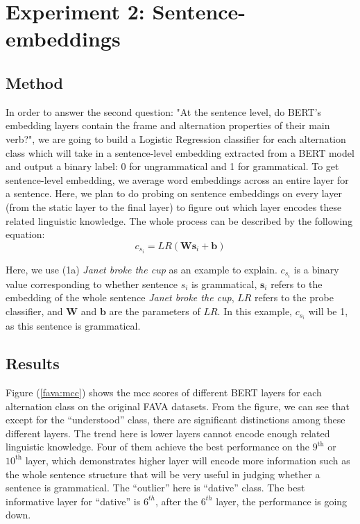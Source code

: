 \documentclass[11pt]{article}
\begin{document}
\section{Experiment 2: Sentence-embeddings}
\label{sec:experiment2}

\subsection{Method}
In order to answer the second question: "At the sentence level, do BERT's embedding layers contain the frame and alternation properties of their main verb?", we are going to build a Logistic Regression classifier for each alternation class which will take in a sentence-level embedding extracted from a BERT model and output a binary label: 0 for ungrammatical and 1 for grammatical. To get sentence-level embedding, we average word embeddings across an entire layer for a sentence. Here, we plan to do probing on sentence embeddings on every layer (from the static layer to the final layer) to figure out which layer encodes these related linguistic knowledge. The whole process can be described by the following equation:
$$c_{{s}_{i}} = LR( \textbf{W}\textbf{s}_{i} +\textbf{b})$$

Here, we use (1a) \textit{Janet broke the cup} as an example to explain. $c_{{s}_{i}}$ is a binary value corresponding to whether sentence $s_i$ is grammatical, $\textbf{s}_{i}$ refers to the embedding of the whole sentence \textit{Janet broke the cup}, $LR$ refers to the probe classifier, and $\textbf{W}$ and $\textbf{b}$ are the parameters of $LR$. In this example, $c_{{s}_{i}}$ will be 1, as this sentence is grammatical.
\subsection{Results}
Figure (\ref{fava:mcc}) shows the mcc scores of different BERT layers for each alternation class on the original FAVA datasets. From the figure, we can see that except for the ``understood'' class, there are significant distinctions among these different layers. The trend here is lower layers cannot encode enough related linguistic knowledge. Four of them achieve the best performance on the $9^{\text{th}}$ or  $10^{\text{th}}$ layer, which demonstrates higher layer will encode more information such as the whole sentence structure that will be very useful in judging whether a sentence is grammatical. The ``outlier'' here is ``dative'' class. The best informative layer for ``dative'' is $6^{th}$, after the $6^{th}$ layer, the performance is going down.
\end{document}
